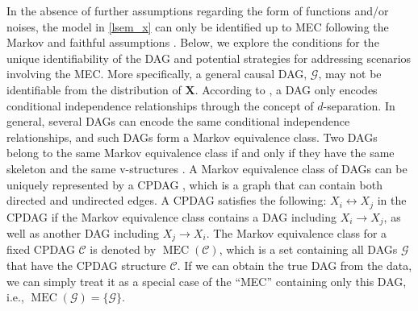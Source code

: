 In the absence of further assumptions regarding the form of functions and/or noises, the model in \eqref{lsem_x} can only be identified up to \acrshort{MEC} following the Markov and faithful assumptions \citep{spirtes2000constructing,peters2014causal}. Below, we explore the conditions for the unique identifiability of the DAG and potential strategies for addressing scenarios involving the \acrshort{MEC}. More specifically, a general causal \acrshort{DAG}, $\mathcal{G}$, may not be identifiable from the distribution of $\boldsymbol{X}$. According to \cite{pearl2000causality}, a \acrshort{DAG} only encodes conditional independence relationships through the concept of $d$-separation. In general, several \acrshort{DAG}s can encode the same conditional independence relationships, and such \acrshort{DAG}s form a Markov equivalence class. Two \acrshort{DAG}s belong to the same Markov equivalence class if and only if they have the same skeleton and the same v-structures \citep{kalisch2007estimating}. A Markov equivalence class of DAGs can be uniquely represented by a \acrfull{CPDAG} \citep{spirtes2000constructing}, which is a graph that can contain both directed and undirected edges. A \acrshort{CPDAG} satisfies the following: $X_i \leftrightarrow X_j$ in the \acrshort{CPDAG} if the Markov equivalence class contains a \acrshort{DAG} including $X_i \rightarrow X_j$, as well as another \acrshort{DAG} including $X_j \rightarrow X_i$. The Markov equivalence class for a fixed CPDAG $\mathcal{C}$ is denoted by $\operatorname{MEC}(\mathcal{C})$, which is a set containing all \acrshort{DAG}s $\mathcal{G}$ that have the \acrshort{CPDAG} structure $\mathcal{C}$. 
If we can obtain the true DAG from the data, we can simply treat it as a special case of the ``\acrshort{MEC}'' containing only this \acrshort{DAG}, i.e., $\operatorname{MEC}(\mathcal{G})= \{ \mathcal{G} \}$. %

